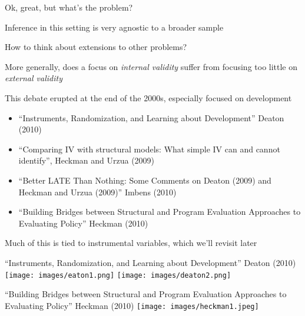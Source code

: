 \documentclass[notes,11pt, aspectratio=169]{beamer}
\newenvironment{wideitemize}{\itemize\addtolength{\itemsep}{10pt}}{\enditemize}
\begin{document}
\begin{frame}{Ok, great, but what's the problem?}
  \begin{wideitemize}
  \item Inference in this setting is very agnostic to a broader sample
  \item How to think about extensions to other problems?
  \item More generally, does a focus on \emph{internal validity}
    suffer from focusing too little on \emph{external validity}
  \item This debate erupted at the end of the 2000s, especially focused on development
    \begin{itemize}
    \item ``Instruments, Randomization, and Learning about Development'' Deaton (2010)
    \item ``Comparing IV with structural models: What simple IV can and cannot identify'', Heckman and Urzua (2009)
    \item ``Better LATE Than Nothing: Some Comments on Deaton (2009) and Heckman and Urzua (2009)'' Imbens (2010)
    \item ``Building Bridges between Structural and Program Evaluation Approaches to Evaluating Policy'' Heckman (2010)
    \end{itemize}
  \item Much of this is tied to instrumental variables, which we'll revisit later
    
  \end{wideitemize}
\end{frame}
\begin{frame}{``Instruments, Randomization, and Learning about Development'' Deaton (2010)}
  \texttt{[image: images/eaton1.png]}
    \texttt{[image: images/deaton2.png]}
\end{frame}

\begin{frame}{``Building Bridges between Structural and Program Evaluation Approaches to Evaluating Policy'' Heckman (2010)}
  \texttt{[image: images/heckman1.jpeg]}
\end{frame}
\end{document}
